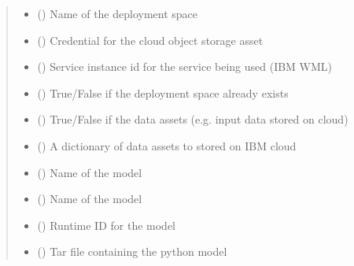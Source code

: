 \documentclass[a4paper,12pt,english]{article}
\begin{document}
\begin{fulllineitems}
\begin{fulllineitems}
\begin{quote}
\begin{description}
\begin{itemize}
\item {} 
 () \textendash{} Name of the deployment space

\item {} 
 () \textendash{} Credential for the cloud object storage asset

\item {} 
 () \textendash{} Service instance id for the service being used (IBM WML)

\item {} 
 () \textendash{} True/False if the deployment space already exists

\item {} 
 () \textendash{} True/False if the data assets (e.g. input data stored on cloud)

\item {} 
 () \textendash{} A dictionary of data assets to stored on IBM cloud

\item {} 
 () \textendash{} Name of the model

\item {} 
 () \textendash{} Name of the model

\item {} 
 () \textendash{} Runtime ID for the model

\item {} 
 () \textendash{} Tar file containing the python model


\end{itemize}
\end{description}
\end{quote}
\end{fulllineitems}
\end{fulllineitems}
\end{document}
